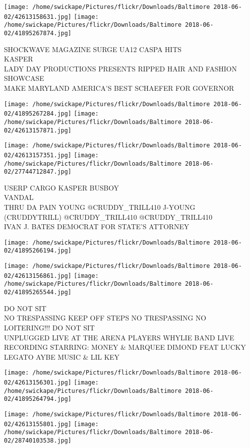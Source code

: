\documentclass[10pt,letterpaper]{article}
\begin{document}
\texttt{[image: /home/swickape/Pictures/flickr/Downloads/Baltimore 2018-06-02/42613158631.jpg]}
\texttt{[image: /home/swickape/Pictures/flickr/Downloads/Baltimore 2018-06-02/41895267874.jpg]}

SHOCKWAVE MAGAZINE SURGE UA12 CASPA HITS\\
KASPER\\
LADY DAY PRODUCTIONS PRESENTS RIPPED HAIR AND FASHION SHOWCASE\\
MAKE MARYLAND AMERICA'S BEST SCHAEFER FOR GOVERNOR
\pagebreak

\texttt{[image: /home/swickape/Pictures/flickr/Downloads/Baltimore 2018-06-02/41895267284.jpg]}
\texttt{[image: /home/swickape/Pictures/flickr/Downloads/Baltimore 2018-06-02/42613157871.jpg]}

\texttt{[image: /home/swickape/Pictures/flickr/Downloads/Baltimore 2018-06-02/42613157351.jpg]}
\texttt{[image: /home/swickape/Pictures/flickr/Downloads/Baltimore 2018-06-02/27744712847.jpg]}

USERP CARGO KASPER BUSBOY\\
VANDAL\\
THRU DA PAIN YOUNG @CRUDDY\_TRILL410 J{-}YOUNG (CRUDDYTRILL) @CRUDDY\_TRILL410 @CRUDDY\_TRILL410\\
IVAN J. BATES DEMOCRAT FOR STATE'S ATTORNEY
\pagebreak

\texttt{[image: /home/swickape/Pictures/flickr/Downloads/Baltimore 2018-06-02/41895266194.jpg]}

\vspace{0.25in}
\texttt{[image: /home/swickape/Pictures/flickr/Downloads/Baltimore 2018-06-02/42613156861.jpg]}
\texttt{[image: /home/swickape/Pictures/flickr/Downloads/Baltimore 2018-06-02/41895265544.jpg]}

DO NOT SIT\\
NO TRESPASSING KEEP OFF STEPS NO TRESPASSING NO LOITERING!!! DO NOT SIT\\
UNPLUGGED LIVE AT THE ARENA PLAYERS WHYLIE BAND LIVE RECORDING STARRING: MONEY \& MARQUEE DIMOND FEAT LUCKY LEGATO AYBE MUSIC \& LIL KEY
\pagebreak

\texttt{[image: /home/swickape/Pictures/flickr/Downloads/Baltimore 2018-06-02/42613156301.jpg]}
\texttt{[image: /home/swickape/Pictures/flickr/Downloads/Baltimore 2018-06-02/41895264794.jpg]}

\texttt{[image: /home/swickape/Pictures/flickr/Downloads/Baltimore 2018-06-02/42613155801.jpg]}
\texttt{[image: /home/swickape/Pictures/flickr/Downloads/Baltimore 2018-06-02/28740103538.jpg]}
\end{document}
